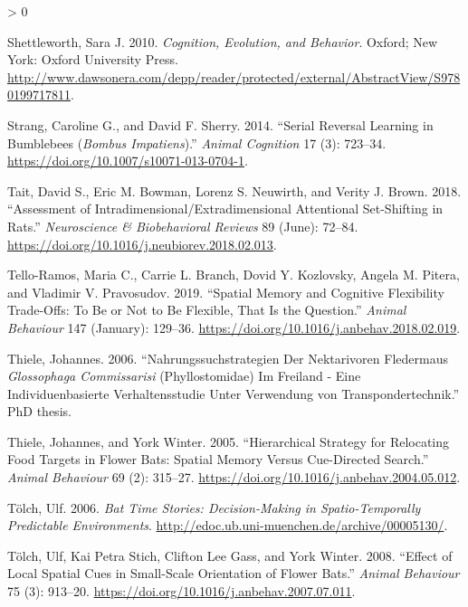 \documentclass[
]{article}
\newlength{\cslhangindent}
\newenvironment{CSLReferences}[2] %
 {%
  \setlength{\parindent}{0pt}
  \ifodd #1 \everypar{\setlength{\hangindent}{\cslhangindent}}\ignorespaces\fi
  \ifnum #2 > 0
  \setlength{\parskip}{#2\baselineskip}
  \fi
 }%
 {}
\begin{document}
\begin{CSLReferences}{1}{0}
\leavevmode\hypertarget{ref-shettleworth_cognition_2010}{}%
Shettleworth, Sara J. 2010. \emph{Cognition, Evolution, and Behavior}. Oxford; New York: Oxford University Press. \url{http://www.dawsonera.com/depp/reader/protected/external/AbstractView/S9780199717811}.

\leavevmode\hypertarget{ref-strang_serial_2014}{}%
Strang, Caroline G., and David F. Sherry. 2014. {``Serial Reversal Learning in Bumblebees (\emph{{Bombus} Impatiens}).''} \emph{Animal Cognition} 17 (3): 723--34. \url{https://doi.org/10.1007/s10071-013-0704-1}.

\leavevmode\hypertarget{ref-tait_assessment_2018}{}%
Tait, David S., Eric M. Bowman, Lorenz S. Neuwirth, and Verity J. Brown. 2018. {``Assessment of Intradimensional/Extradimensional Attentional Set-Shifting in Rats.''} \emph{Neuroscience \& Biobehavioral Reviews} 89 (June): 72--84. \url{https://doi.org/10.1016/j.neubiorev.2018.02.013}.

\leavevmode\hypertarget{ref-tello-ramos_spatial_2019}{}%
Tello-Ramos, Maria C., Carrie L. Branch, Dovid Y. Kozlovsky, Angela M. Pitera, and Vladimir V. Pravosudov. 2019. {``Spatial Memory and Cognitive Flexibility Trade-Offs: To Be or Not to Be Flexible, That Is the Question.''} \emph{Animal Behaviour} 147 (January): 129--36. \url{https://doi.org/10.1016/j.anbehav.2018.02.019}.

\leavevmode\hypertarget{ref-thiele_nahrungssuchstrategien_2006}{}%
Thiele, Johannes. 2006. {``Nahrungssuchstrategien Der Nektarivoren {Fledermaus} \emph{{Glossophaga} Commissarisi} ({Phyllostomidae}) Im {Freiland} - Eine Individuenbasierte {Verhaltensstudie} Unter {Verwendung} von {Transpondertechnik}.''} PhD thesis.

\leavevmode\hypertarget{ref-thiele_hierarchical_2005}{}%
Thiele, Johannes, and York Winter. 2005. {``Hierarchical Strategy for Relocating Food Targets in Flower Bats: Spatial Memory Versus Cue-Directed Search.''} \emph{Animal Behaviour} 69 (2): 315--27. \url{https://doi.org/10.1016/j.anbehav.2004.05.012}.

\leavevmode\hypertarget{ref-tolch_bat_2006}{}%
Tölch, Ulf. 2006. \emph{Bat Time Stories: Decision-Making in Spatio-Temporally Predictable Environments}. \url{http://edoc.ub.uni-muenchen.de/archive/00005130/}.

\leavevmode\hypertarget{ref-tolch_effect_2008}{}%
Tölch, Ulf, Kai Petra Stich, Clifton Lee Gass, and York Winter. 2008. {``Effect of Local Spatial Cues in Small-Scale Orientation of Flower Bats.''} \emph{Animal Behaviour} 75 (3): 913--20. \url{https://doi.org/10.1016/j.anbehav.2007.07.011}.


\end{CSLReferences}
\end{document}
